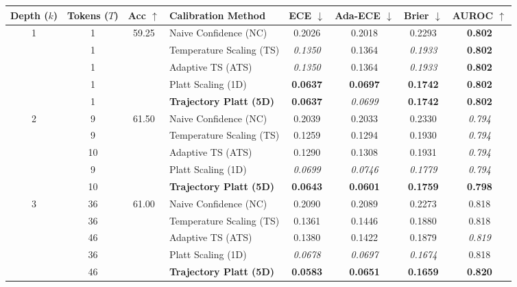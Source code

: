 \begin{table}[t]
\setlength{\tabcolsep}{4pt}
\renewcommand{\arraystretch}{1.05}
\centering
\footnotesize
\begin{tabular}{ccclcccc}
\toprule
\textbf{Depth ($k$)} & \textbf{Tokens ($T$)} & \textbf{Acc} $\uparrow$ & \textbf{Calibration Method} & \textbf{ECE} $\downarrow$ & \textbf{Ada-ECE} $\downarrow$ & \textbf{Brier} $\downarrow$ & \textbf{AUROC} $\uparrow$ \\
\midrule
\multirow{5}{*}{1} & 1 & \multirow{5}{*}{59.25} & Naive Confidence (NC) & 0.2026 & 0.2018 & 0.2293 & \textbf{0.802} \\
 & 1 &  & Temperature Scaling (TS) & \textit{0.1350} & 0.1364 & \textit{0.1933} & \textbf{0.802} \\
 & 1 &  & Adaptive TS (ATS) & \textit{0.1350} & 0.1364 & \textit{0.1933} & \textbf{0.802} \\
 & 1 &  & Platt Scaling (1D) & \textbf{0.0637} & \textbf{0.0697} & \textbf{0.1742} & \textbf{0.802} \\
 & 1 &  & \textbf{Trajectory Platt (5D)} & \textbf{0.0637} & \textit{0.0699} & \textbf{0.1742} & \textbf{0.802} \\
\midrule
\multirow{5}{*}{2} & 9 & \multirow{5}{*}{61.50} & Naive Confidence (NC) & 0.2039 & 0.2033 & 0.2330 & \textit{0.794} \\
 & 9 &  & Temperature Scaling (TS) & 0.1259 & 0.1294 & 0.1930 & \textit{0.794} \\
 & 10 &  & Adaptive TS (ATS) & 0.1290 & 0.1308 & 0.1931 & \textit{0.794} \\
 & 9 &  & Platt Scaling (1D) & \textit{0.0699} & \textit{0.0746} & \textit{0.1779} & \textit{0.794} \\
 & 10 &  & \textbf{Trajectory Platt (5D)} & \textbf{0.0643} & \textbf{0.0601} & \textbf{0.1759} & \textbf{0.798} \\
\midrule
\multirow{5}{*}{3} & 36 & \multirow{5}{*}{61.00} & Naive Confidence (NC) & 0.2090 & 0.2089 & 0.2273 & 0.818 \\
 & 36 &  & Temperature Scaling (TS) & 0.1361 & 0.1446 & 0.1880 & 0.818 \\
 & 46 &  & Adaptive TS (ATS) & 0.1380 & 0.1422 & 0.1879 & \textit{0.819} \\
 & 36 &  & Platt Scaling (1D) & \textit{0.0678} & \textit{0.0697} & \textit{0.1674} & 0.818 \\
 & 46 &  & \textbf{Trajectory Platt (5D)} & \textbf{0.0583} & \textbf{0.0651} & \textbf{0.1659} & \textbf{0.820} \\

\end{tabular}
\end{table}

